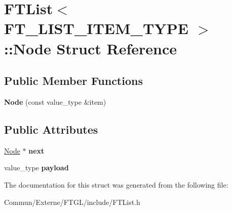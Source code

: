 \hypertarget{struct_f_t_list_1_1_node}{}\section{F\+T\+List$<$ F\+T\+\_\+\+L\+I\+S\+T\+\_\+\+I\+T\+E\+M\+\_\+\+T\+Y\+PE $>$\+:\+:Node Struct Reference}
\label{struct_f_t_list_1_1_node}
\subsection*{Public Member Functions}
\begin{DoxyCompactItemize}
\item 
{\bfseries Node} (const value\+\_\+type \&item)\hypertarget{struct_f_t_list_1_1_node_a514fbd667097faa5b9b491c5805a00ee}{}\label{struct_f_t_list_1_1_node_a514fbd667097faa5b9b491c5805a00ee}

\end{DoxyCompactItemize}
\subsection*{Public Attributes}
\begin{DoxyCompactItemize}
\item 
\hyperlink{struct_f_t_list_1_1_node}{Node} $\ast$ {\bfseries next}\hypertarget{struct_f_t_list_1_1_node_a395fc8c57ab9f02c87db8f860d7cd961}{}\label{struct_f_t_list_1_1_node_a395fc8c57ab9f02c87db8f860d7cd961}

\item 
value\+\_\+type {\bfseries payload}\hypertarget{struct_f_t_list_1_1_node_a87a70c8c844286a1fdd8e9fe1b298b2d}{}\label{struct_f_t_list_1_1_node_a87a70c8c844286a1fdd8e9fe1b298b2d}

\end{DoxyCompactItemize}


The documentation for this struct was generated from the following file\+:\begin{DoxyCompactItemize}
\item 
Commun/\+Externe/\+F\+T\+G\+L/include/F\+T\+List.\+h\end{DoxyCompactItemize}
